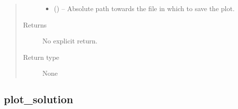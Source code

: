 \documentclass[letterpaper,10pt,english]{sphinxmanual}
\begin{document}
\begin{fulllineitems}
\begin{quote}
\begin{description}
\begin{itemize}
\item {} 
 () -- Absolute path towards the file in which to save the plot.

\end{itemize}

\item[{Returns}] \leavevmode
No explicit return.

\item[{Return type}] \leavevmode
None

\end{description}\end{quote}

\end{fulllineitems}



\subsection{plot\_solution}
\label{\detokenize{api/ucf.plot_solution:plot-solution}}\label{\detokenize{api/ucf.plot_solution::doc}}
\end{document}
